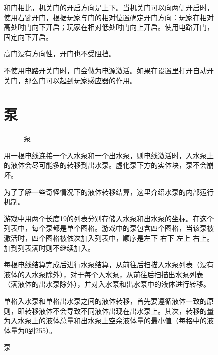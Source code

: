 \begin{figure}[!ht]
和门相比，机关门的开启方向是上下。当机关门可以向两侧开启时，使用右键开门，根据玩家与门的相对位置确定开门方向：玩家在相对高处时门向下开启；玩家在相对低处时门向上开启。使用电路开门，固定向下开启。

高门没有方向性，开门也不受阻挡。

不使用电路开关门时，门会做为电源激活。如果在设置里打开自动开关门，那么门可以起到玩家感应器的作用。

\section{泵}
\begin{figure}[!ht]
\centering
{}\qquad
{}
\caption{泵}
\end{figure}
用一根电线连接一个入水泵和一个出水泵，则电线激活时，入水泵上的液体会尽可能多的转移到出水泵。虚化泵下方的实体块，泵不会崩坏。

为了了解一些奇怪情况下的液体转移结算，这里介绍水泵的内部运行机制。

游戏中用两个长度19的列表分别存储入水泵和出水泵的坐标。在这个列表中，每个泵都是单个图格。游戏中的泵包含四个图格，当该泵被激活时，四个图格被依次加入列表中，顺序是左下-右下-左上-右上。加到列表满时则不继续加入。

每根电线结算完成后进行水泵结算，从前往后扫描入水泵列表（没有液体的入水泵除外），对于每个入水泵，从前往后扫描出水泵列表（满液体的出水泵除外），并对入水泵和出水泵中的液体进行转移。

单格入水泵和单格出水泵之间的液体转移，首先要遵循液体一致的原则，即转移液体不会导致不同液体出现在出水泵上。其次，转移的量为入水泵上的液体总量和出水泵上空余液体量的最小值（每格中的液体量为0到255）。


\end{figure}
